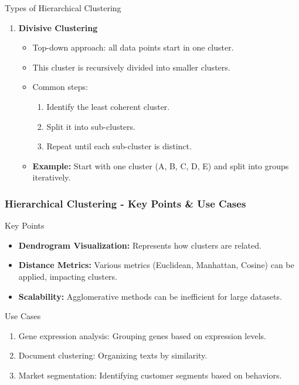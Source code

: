 \documentclass[aspectratio=169]{beamer}
\begin{document}
\begin{frame}[fragile]
\begin{block}{Types of Hierarchical Clustering}
\begin{enumerate}
            \item \textbf{Divisive Clustering}
            \begin{itemize}
                \item Top-down approach: all data points start in one cluster.
                \item This cluster is recursively divided into smaller clusters.
                \item Common steps:
                \begin{enumerate}
                    \item Identify the least coherent cluster.
                    \item Split it into sub-clusters.
                    \item Repeat until each sub-cluster is distinct.
                \end{enumerate}
                \item \textbf{Example:} Start with one cluster (A, B, C, D, E) and split into groups iteratively.
            \end{itemize}
        \end{enumerate}
    \end{block}
\end{frame}

\begin{frame}[fragile]
    \frametitle{Hierarchical Clustering - Key Points & Use Cases}
    \begin{block}{Key Points}
        \begin{itemize}
            \item \textbf{Dendrogram Visualization:} Represents how clusters are related.
            \item \textbf{Distance Metrics:} Various metrics (Euclidean, Manhattan, Cosine) can be applied, impacting clusters.
            \item \textbf{Scalability:} Agglomerative methods can be inefficient for large datasets.
        \end{itemize}
    \end{block}
    
    \begin{block}{Use Cases}
        \begin{enumerate}
            \item Gene expression analysis: Grouping genes based on expression levels.
            \item Document clustering: Organizing texts by similarity.
            \item Market segmentation: Identifying customer segments based on behaviors.
        \end{enumerate}
    \end{block}
\end{frame}
\end{document}
